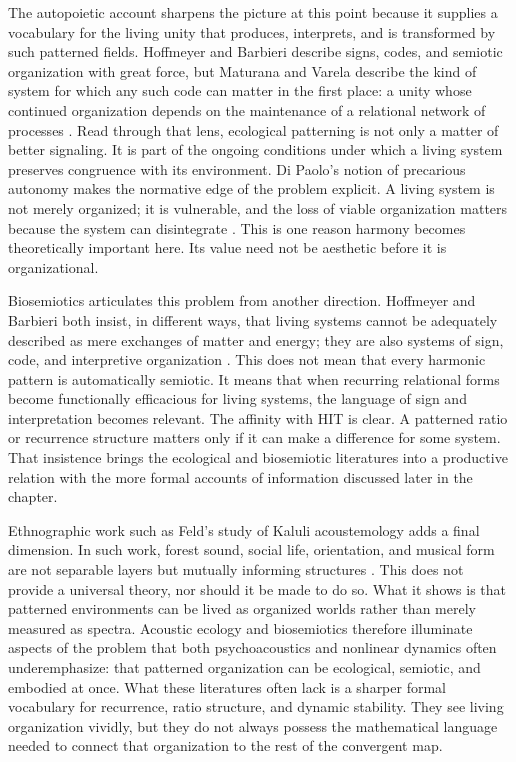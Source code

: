 The autopoietic account sharpens the picture at this point because it supplies a vocabulary for the living unity that produces, interprets, and is transformed by such patterned fields. Hoffmeyer and Barbieri describe signs, codes, and semiotic organization with great force, but Maturana and Varela describe the kind of system for which any such code can matter in the first place: a unity whose continued organization depends on the maintenance of a relational network of processes \parencite{maturana_varela_1980}. Read through that lens, ecological patterning is not only a matter of better signaling. It is part of the ongoing conditions under which a living system preserves congruence with its environment. Di Paolo's notion of precarious autonomy makes the normative edge of the problem explicit. A living system is not merely organized; it is vulnerable, and the loss of viable organization matters because the system can disintegrate \parencite{dipaolo_2005}. This is one reason harmony becomes theoretically important here. Its value need not be aesthetic before it is organizational.

Biosemiotics articulates this problem from another direction. Hoffmeyer and Barbieri both insist, in different ways, that living systems cannot be adequately described as mere exchanges of matter and energy; they are also systems of sign, code, and interpretive organization \parencite{hoffmeyer_2008, barbieri_2008}. This does not mean that every harmonic pattern is automatically semiotic. It means that when recurring relational forms become functionally efficacious for living systems, the language of sign and interpretation becomes relevant. The affinity with HIT is clear. A patterned ratio or recurrence structure matters only if it can make a difference for some system. That insistence brings the ecological and biosemiotic literatures into a productive relation with the more formal accounts of information discussed later in the chapter.

Ethnographic work such as Feld's study of Kaluli acoustemology adds a final dimension. In such work, forest sound, social life, orientation, and musical form are not separable layers but mutually informing structures \parencite{feld_1982}. This does not provide a universal theory, nor should it be made to do so. What it shows is that patterned environments can be lived as organized worlds rather than merely measured as spectra. Acoustic ecology and biosemiotics therefore illuminate aspects of the problem that both psychoacoustics and nonlinear dynamics often underemphasize: that patterned organization can be ecological, semiotic, and embodied at once. What these literatures often lack is a sharper formal vocabulary for recurrence, ratio structure, and dynamic stability. They see living organization vividly, but they do not always possess the mathematical language needed to connect that organization to the rest of the convergent map.

